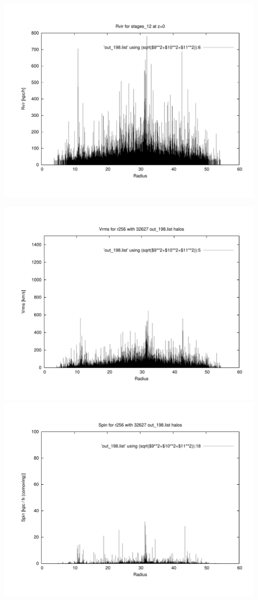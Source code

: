 \includegraphics[scale=0.3]{stages_12/plot_rvir_z0.pdf}

\includegraphics[scale=0.3]{stages_12/plot_Vrms_out_198.pdf}
\includegraphics[scale=0.3]{stages_12/plot_spin_out_198.pdf}

